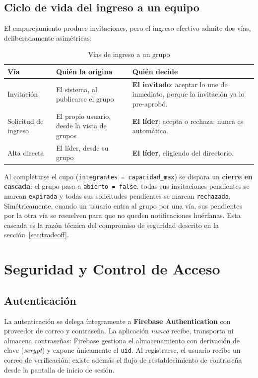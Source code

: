 \documentclass[12pt,a4paper]{article}
\begin{document}
\subsection{Ciclo de vida del ingreso a un equipo}
El emparejamiento produce invitaciones, pero el ingreso efectivo admite dos vías, deliberadamente asimétricas:

\begin{table}[htbp]
\centering
\caption{Vías de ingreso a un grupo}
\begin{tabular}{L{3.3cm}L{4.6cm}L{5.6cm}}
\toprule
\textbf{Vía} & \textbf{Quién la origina} & \textbf{Quién decide} \\
\midrule
Invitación & El sistema, al publicarse el grupo & \textbf{El invitado}: aceptar lo une de inmediato, porque la invitación ya lo pre-aprobó. \\
Solicitud de ingreso & El propio usuario, desde la vista de grupos & \textbf{El líder}: acepta o rechaza; nunca es automática. \\
Alta directa & El líder, desde su grupo & \textbf{El líder}, eligiendo del directorio. \\
\bottomrule
\end{tabular}
\end{table}

Al completarse el cupo (\texttt{integrantes = capacidad\_max}) se dispara un \textbf{cierre en cascada}: el grupo pasa a \texttt{abierto = false}, todas sus invitaciones pendientes se marcan \texttt{expirada} y todas sus solicitudes pendientes se marcan \texttt{rechazada}. Simétricamente, cuando un usuario entra al grupo por una vía, sus pendientes por la otra vía se resuelven para que no queden notificaciones huérfanas. Esta cascada es la razón técnica del compromiso de seguridad descrito en la sección~\ref{sec:tradeoff}.

\newpage
\section{Seguridad y Control de Acceso}
\label{sec:seguridad}

\subsection{Autenticación}
La autenticación se delega íntegramente a \textbf{Firebase Authentication} con proveedor de correo y contraseña. La aplicación \emph{nunca} recibe, transporta ni almacena contraseñas: Firebase gestiona el almacenamiento con derivación de clave (\emph{scrypt}) y expone únicamente el \texttt{uid}. Al registrarse, el usuario recibe un correo de verificación; existe además el flujo de restablecimiento de contraseña desde la pantalla de inicio de sesión.
\end{document}
